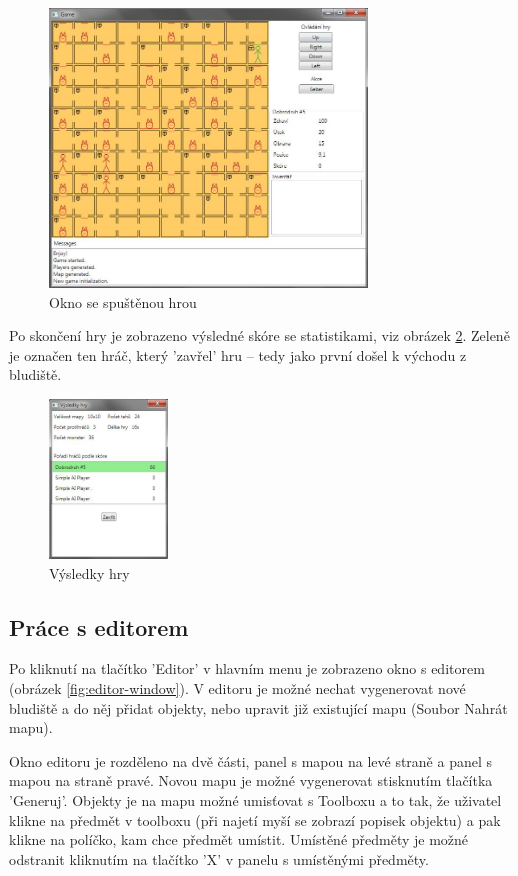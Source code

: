 \documentclass[11pt,a4paper]{scrartcl}
\begin{document}
	\begin{figure}[H]
		\centering
		\includegraphics[height=280px]{game-window}
		\caption{Okno se spuštěnou hrou}
		\label{fig:game-window}
	\end{figure}
	
	
	Po skončení hry je zobrazeno výsledné skóre se statistikami, viz obrázek \ref{fig:game-res-window}. Zeleně je označen ten hráč, který 'zavřel' hru -- tedy jako první došel k východu z bludiště.
	
	\begin{figure}[H]
		\centering
		\includegraphics[height=160px]{score-window}
		\caption{Výsledky hry}
		\label{fig:game-res-window}
	\end{figure}
	
	\subsection{Práce s editorem}
	Po kliknutí na tlačítko 'Editor' v hlavním menu je zobrazeno okno s editorem (obrázek \ref{fig:editor-window}). V editoru je možné nechat vygenerovat nové bludiště a do něj přidat objekty, nebo upravit již existující mapu (Soubor \textrightarrow Nahrát mapu).
	
	Okno editoru je rozděleno na dvě části, panel s mapou na levé straně a panel s mapou na straně pravé. Novou mapu je možné vygenerovat stisknutím tlačítka 'Generuj'. Objekty je na mapu možné umisťovat s Toolboxu a to tak, že uživatel klikne na předmět v toolboxu (při najetí myší se zobrazí popisek objektu) a pak klikne na políčko, kam chce předmět umístit. Umístěné předměty je možné odstranit kliknutím na tlačítko 'X' v panelu s umístěnými předměty.
	
\end{document}
